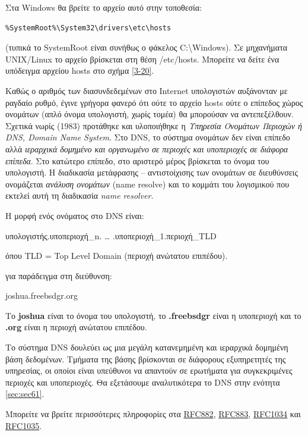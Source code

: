 Στα Windows θα βρείτε το αρχείο αυτό στην τοποθεσία:

\begin{verbatim}
%SystemRoot%\System32\drivers\etc\hosts
\end{verbatim}

(τυπικά το SystemRoot είναι συνήθως ο φάκελος C:\textbackslash{}Windows). Σε μηχανήματα UNIX/Linux το αρχείο βρίσκεται στη θέση /etc/hosts. Μπορείτε να δείτε ένα υπόδειγμα αρχείου hosts στο σχήμα \ref{3-20}.

Καθώς ο αριθμός των διασυνδεδεμένων στο Internet υπολογιστών αυξάνονταν με ραγδαίο ρυθμό, έγινε γρήγορα φανερό ότι ούτε το αρχείο hosts ούτε ο επίπεδος χώρος ονομάτων (απλό όνομα υπολογιστή, χωρίς τομέα) θα μπορούσαν να αντεπεξέλθουν. Σχετικά νωρίς (1983) προτάθηκε και υλοποιήθηκε η \emph{Υπηρεσία Ονομάτων Περιοχών ή DNS, Domain Name System}. Στο DNS, το σύστημα ονομάτων δεν είναι επίπεδο αλλά \emph{ιεραρχικά δομημένο και οργανωμένο σε περιοχές και υποπεριοχές σε διάφορα επίπεδα}. Στο κατώτερο επίπεδο, στο αριστερό μέρος βρίσκεται το όνομα του υπολογιστή. Η διαδικασία μετάφρασης -- αντιστοίχισης των ονομάτων σε διευθύνσεις ονομάζεται \emph{ανάλυση ονομάτων} (name resolve) και το κομμάτι του λογισμικού που εκτελεί αυτή τη διαδικασία \emph{name resolver}.

Η μορφή ενός ονόματος στο DNS είναι:

\begin{centering}
υπολογιστής.υποπεριοχή\_n. \ldots{} .υποπεριοχή\_1.περιοχή\_TLD
\end{centering}

όπου TLD = Top Level Domain (περιοχή ανώτατου επιπέδου).

για παράδειγμα στη διεύθυνση:

\begin{centering}
joshua.freebsdgr.org
\end{centering}

Το \textbf{joshua} είναι το όνομα του υπολογιστή, το \textbf{.freebsdgr} είναι η υποπεριοχή και το \textbf{.org} είναι η περιοχή ανώτατου επιπέδου.

Το σύστημα DNS δουλεύει ως μια μεγάλη κατανεμημένη και ιεραρχικά δομημένη βάση δεδομένων. Τμήματα της βάσης βρίσκονται σε διάφορους εξυπηρετητές της υπηρεσίας, οι οποίοι είναι υπεύθυνοι να απαντούν σε ερωτήματα για συγκεκριμένες περιοχές και υποπεριοχές. Θα εξετάσουμε αναλυτικότερα το DNS στην ενότητα \ref{sec:sec61}. 

Μπορείτε να βρείτε περισσότερες πληροφορίες στα \href{https://www.ietf.org/rfc/rfc882.txt}{RFC882}, \href{https://www.ietf.org/rfc/rfc883.txt}{RFC883}, \href{https://www.ietf.org/rfc/rfc1034.txt}{RFC1034} και \href{https://www.ietf.org/rfc/rfc1035.txt}{RFC1035}.